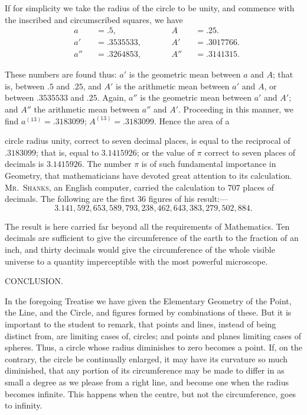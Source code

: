 \documentclass[oneside]{book}
\newcommand{\ibksp}{\hspace{-1.5em}}
\begin{document}
\begin{footnotesize}
If for simplicity we take the radius of the circle to be unity,
and commence with the inscribed and circumscribed squares, we
have
\[
\begin{alignedat}{4}
  &a   &&=.5,              &&A   &&=.25. \\
  &a'  &&=.3535533,\qquad  &&A'  &&=.3017766. \\
  &a'' &&=.3264853,        &&A'' &&=.3141315.
\end{alignedat}
\]

These numbers are found thus: $a'$ is the geometric mean between
$a$ and $A$; that is, between $.5$ and $.25$, and $A'$ is the arithmetic
mean between $a'$ and $A$, or between $.3535533$ and $.25$.
Again, $a''$ is the geometric mean between $a'$ and $A'$; and $A''$ the
arithmetic mean between $a''$ and $A'$. Proceeding in this manner,
we find $a^{(13)}=.3183099$; $A^{(13)} =.3183099$. Hence the area of a

circle radius unity, correct to seven decimal places, is equal to the
reciprocal of $.3183099$; that is, equal to $3.1415926$; or the value
of $\pi$ correct to seven places of decimals is $3.1415926$. The
number $\pi$ is of such fundamental importance in Geometry, that
mathematicians have devoted great attention to its calculation.
\textsc{Mr.\ Shanks}, an English computer, carried the calculation to
$707$ places of decimals. The following are the first $36$ figures
of his result:---
\[
3.141,592,653,589,793,238,462,643,383,279,502,884.
\]

The result is here carried far beyond all the requirements
of Mathematics. Ten decimals are sufficient to give the circumference
of the earth to the fraction of an inch, and thirty
decimals would give the circumference of the whole visible
universe to a quantity imperceptible with the most powerful
microscope.
\end{footnotesize}


\newpage
\addcontentsline{toc}{section}{\bigskip\ibksp Conclusion,}
\begin{center}
CONCLUSION.
\end{center}

In the foregoing Treatise we have given the
Elementary Geometry of the Point, the Line, and
the Circle, and figures formed by combinations of
these. But it is important to the student to remark,
that points and lines, instead of being distinct from,
are limiting cases of, circles; and points and planes
limiting cases of spheres. Thus, a circle whose
radius diminishes to zero becomes a point. If, on
the contrary, the circle be continually enlarged, it
may have its curvature so much diminished, that
any portion of its circumference may be made to
differ in as small a degree as we please from a right
line, and become one when the radius becomes infinite.
This happens when the centre, but not the
circumference, goes to infinity.
\end{document}

